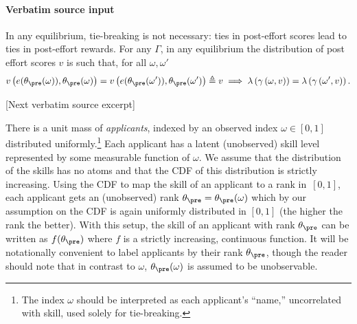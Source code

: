 \documentclass[10pt]{article}
\begin{document}
\paragraph{Verbatim source input}
\begin{ReviewVerbatim}
\begin{lemma}
In any equilibrium, tie-breaking %
{is not necessary}: ties in post-effort scores lead to ties in post-effort rewards. For any $\Gamma$, in any equilibrium the distribution of post effort scores $v$ is such that, for all $\omega, \omega'$
\[
v\left(e(\theta_\pre(\omega)),\theta_\pre(\omega)\right) = v\left(e(\theta_\pre(\omega')),\theta_\pre(\omega')\right) \triangleq v \implies
\lambda\left(\gamma\left(\omega, v \right)\right) = \lambda\left(\gamma\left(\omega', v \right)\right).
\]
\label{lem:tienotmatter}
\end{lemma}

[Next verbatim source excerpt]

There is a unit mass of \textit{applicants}, indexed by an observed index $\omega \in [0,1]$ distributed uniformly.\footnote{The index $\omega$ should be interpreted as each applicant's ``name,'' uncorrelated with skill, used solely for tie-breaking.}  Each applicant has a latent (unobserved) skill level represented by some measurable function of $\omega$.
We assume that {the distribution of the skills} has no atoms and that the CDF of this distribution is strictly increasing.
Using the CDF to map the skill of an applicant to a rank in~$[0,1]$, each applicant gets an (unobserved) rank $\theta_\pre =\theta_\pre(\omega)$ which by our assumption on the CDF is again uniformly distributed in $[0, 1]$ (the higher the rank the better).  With this setup, the skill of an applicant with rank $\theta_\pre$ can be written as $f(\theta_\pre)$ where $f$ is a strictly increasing, continuous function.  {It will be notationally convenient to label applicants by their rank $\theta_\pre$, though the reader should note that in contrast to $\omega$, $\theta_\pre(\omega)$ is assumed to be unobservable.}




\end{ReviewVerbatim}
\end{document}
